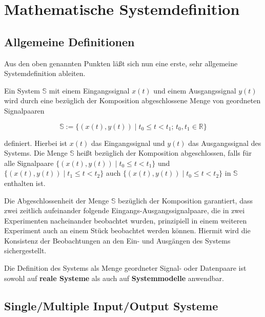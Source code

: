 \section{Mathematische Systemdefinition}
\label{sec:systemdefinition}

\subsection{Allgemeine Definitionen}
\label{sec:system-allgemein}

Aus den oben genannten Punkten läßt sich nun eine erste, sehr allgemeine Systemdefinition ableiten.

\begin{definition}
Ein System $\mathbb{S}$ mit einem Eingangssignal $x(t)$ und einem Ausgangssignal $y(t)$ wird durch eine bezüglich der Komposition abgeschlossene Menge von geordneten Signalpaaren

\begin{equation}
\mathbb{S} := \{(x(t), y(t)) \mid t_0 \leq t < t_1;\, t_0, t_1 \in \mathbb{R}\}
\label{eq:systemdefinition}
\end{equation}

definiert. Hierbei ist $x(t)$ das Eingangssignal und $y(t)$ das Ausgangssignal des Systems. Die Menge $\mathbb{S}$ heißt bezüglich der Komposition abgeschlossen, falls für alle Signalpaare $\{(x(t), y(t)) \mid t_0 \leq t < t_1\}$ und $\{(x(t), y(t)) \mid t_1 \leq t < t_2\}$ auch $\{(x(t), y(t)) \mid t_0 \leq t < t_2\}$ in $\mathbb{S}$ enthalten ist.
\end{definition}

Die Abgeschlossenheit der Menge $\mathbb{S}$ bezüglich der Komposition garantiert, dass zwei zeitlich aufeinander folgende Eingangs-Ausgangssignalpaare, die in zwei Experimenten nacheinander beobachtet wurden, prinzipiell in einem weiteren Experiment auch an einem Stück beobachtet werden können. Hiermit wird die Konsistenz der Beobachtungen an den Ein- und Ausgängen des Systems sichergestellt.

Die Definition des Systems als Menge geordneter Signal- oder Datenpaare ist sowohl auf \textbf{reale Systeme} als auch auf \textbf{Systemmodelle} anwendbar.

\subsection{Single/Multiple Input/Output Systeme}
\label{sec:siso-mimo}

